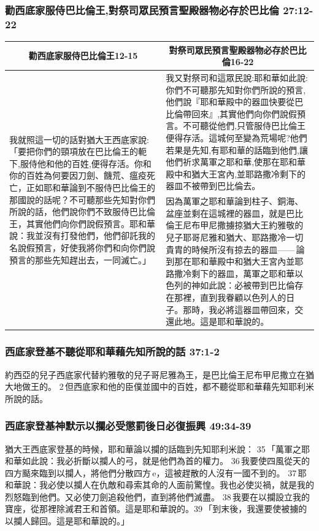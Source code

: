 \subsubsection{勸西底家服侍巴比倫王,對祭司眾民預言聖殿器物必存於巴比倫 27:12-22}
\begin{table}[H]
\centering
\begin{tabular}{p{}|p{11.50cm}}\hline\hline
\multicolumn{1}{c|}{勸西底家服侍巴比倫王12-15}&\multicolumn{1}{c}{對祭司眾民預言聖殿器物必存於巴比倫16-22}\\\hline
\multirow{2}{6.2cm}{我就照這一切的話對猶大王西底家說:「要把你們的頸項放在巴比倫王的軛下,服侍他和他的百姓,便得存活。你和你的百姓為何要因刀劍、饑荒、瘟疫死亡，正如耶和華論到不服侍巴比倫王的那國說的話呢？不可聽那些先知對你們所說的話，他們說你們不致服侍巴比倫王，其實他們向你們說假預言。耶和華說：我並沒有打發他們，他們卻託我的名說假預言，好使我將你們和向你們說預言的那些先知趕出去，一同滅亡。」}
&我又對祭司和這眾民說:耶和華如此說:你們不可聽那先知對你們所說的預言,他們說『耶和華殿中的器皿快要從巴比倫帶回來』,其實他們向你們說假預言。不可聽從他們,只管服侍巴比倫王便得存活。這城何至變為荒場呢?他們若果是先知,有耶和華的話臨到他們,讓他們祈求萬軍之耶和華,使那在耶和華殿中和猶大王宮內,並耶路撒冷剩下的器皿不被帶到巴比倫去。\\\cline{2-2} 
&因為萬軍之耶和華論到柱子、銅海、盆座並剩在這城裡的器皿，就是巴比倫王尼布甲尼撒擄掠猶大王約雅敬的兒子耶哥尼雅和猶大、耶路撒冷一切貴胄的時候所沒有掠去的器皿—— 論到那在耶和華殿中和猶大王宮內並耶路撒冷剩下的器皿，萬軍之耶和華以色列的神如此說：必被帶到巴比倫存在那裡，直到我眷顧以色列人的日子。那時，我必將這器皿帶回來，交還此地。這是耶和華說的。\\\hline
\end{tabular}
\end{table}

\subsubsection{西底家登基不聽從耶和華藉先知所說的話 37:1-2}
約西亞的兒子西底家代替約雅敬的兒子哥尼雅為王，是巴比倫王尼布甲尼撒立在猶大地做王的。 2 但西底家和他的臣僕並國中的百姓，都不聽從耶和華藉先知耶利米所說的話。

\subsubsection{西底家登基神默示以攔必受懲罰後日必復振興 49:34-39}
猶大王西底家登基的時候，耶和華論以攔的話臨到先知耶利米說： 35 「萬軍之耶和華如此說：我必折斷以攔人的弓，就是他們為首的權力。 36 我要使四風從天的四方颳來臨到以攔人，將他們分散四方 e，這被趕散的人沒有一國不到的。 37 耶和華說：我必使以攔人在仇敵和尋索其命的人面前驚惶。我也必使災禍，就是我的烈怒臨到他們。又必使刀劍追殺他們，直到將他們滅盡。 38 我要在以攔設立我的寶座，從那裡除滅君王和首領。這是耶和華說的。39 「到末後，我還要使被擄的以攔人歸回。這是耶和華說的。」


